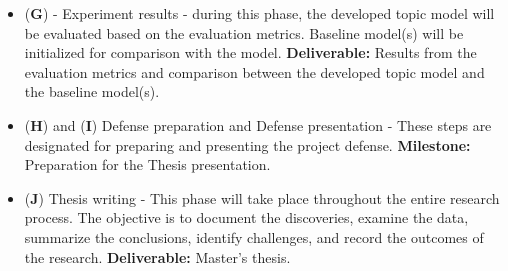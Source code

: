 \documentclass{article}
\begin{document}
\begin{itemize}
    \item (\textbf{G}) - Experiment results - during this phase, the developed topic model will be evaluated based on the evaluation metrics. Baseline model(s) will be initialized for comparison with the model. \textbf{Deliverable:} Results from the evaluation metrics and comparison between the developed topic model and the baseline model(s).

    \item (\textbf{H}) and (\textbf{I}) Defense preparation and Defense presentation - These steps are designated for preparing and presenting the project defense. \textbf{Milestone:} Preparation for the Thesis presentation.

    \item (\textbf{J}) Thesis writing - This phase will take place throughout the entire research process. The objective is to document the discoveries, examine the data, summarize the conclusions, identify challenges, and record the outcomes of the research. \textbf{Deliverable:} Master’s thesis.
\end{itemize}
\end{document}
